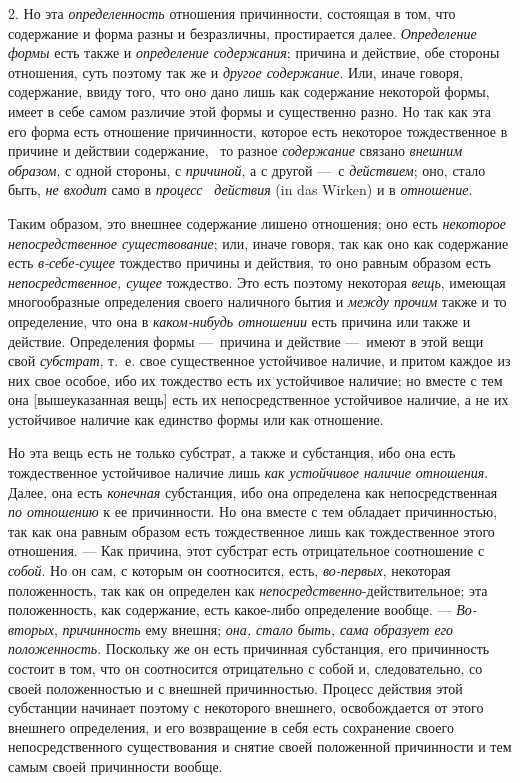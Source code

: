 2. Но эта {\em определенность} отношения причинности,
состоящая в том, что содержание и форма разны и безразличны, простирается
далее. {\em Определение формы} есть также и
{\em определение содержания}; причина и действие, обе
стороны отношения, суть поэтому так же и {\em другое
содержание}. Или, иначе говоря, содержание, ввиду того, что оно дано лишь
как содержание некоторой формы, имеет в себе самом различие этой формы и
существенно разно. Но так как эта его форма есть отношение причинности,
которое есть некоторое тождественное в причине и действии содержание, \ то
разное {\em содержание} связано
{\em внешним образом}, с одной стороны, с
{\em причиной}, а с другой —~с
{\em действием}; оно, стало быть,
{\em не входит} само в
{\em процесс} \ {\em действия} (in
das Wirken) и в {\em отношение}.

Таким образом, это внешнее содержание лишено отношения; оно есть
{\em некоторое непосредственное существование}; или,
иначе говоря, так как оно как содержание есть
{\em в-себе-сущее} тождество причины и действия, то оно
равным образом есть {\em непосредственное, сущее}
тождество. Это есть поэтому некоторая {\em вещь},
имеющая многообразные определения своего наличного бытия и
{\em между прочим} также и то определение, что она в
{\em каком-нибудь отношении} есть причина или также и
действие. Определения формы —~причина и действие —~имеют в этой вещи свой
{\em субстрат}, т.~е. свое существенное устойчивое
наличие, и притом каждое из них свое особое, ибо их тождество есть их
устойчивое наличие; но вместе с тем она [вышеуказанная вещь] есть их
непосредственное устойчивое наличие, а не их устойчивое наличие как
единство формы или как отношение.

Но эта вещь есть не только субстрат, а также и субстанция, ибо она есть
тождественное устойчивое наличие лишь {\em как
устойчивое наличие отношения}. Далее, она есть
{\em конечная} субстанция, ибо она определена как
непосредственная {\em по отношению} к ее причинности.
Но она вместе с тем обладает причинностью, так как она равным образом есть
тождественное лишь как тождественное этого отношения. — Как причина, этот
субстрат есть отрицательное соотношение с {\em собой}.
Но он сам, с которым он соотносится, есть,
{\em во-первых}, некоторая положенность, так как он
определен как {\em непосредственно}{}-действительное;
эта положенность, как содержание, есть какое-либо определение вообще. —
{\em Во-вторых}, {\em причинность}
ему внешня; {\em она, стало быть, сама образует его
положенность}. Поскольку же он есть причинная субстанция, его причинность
состоит в том, что он соотносится отрицательно с собой и, следовательно, со
своей положенностью и с внешней причинностью. Процесс действия этой
субстанции начинает поэтому с некоторого внешнего, освобождается от этого
внешнего определения, и его возвращение в себя есть сохранение своего
непосредственного существования и снятие своей положенной причинности и тем
самым своей причинности вообще.

